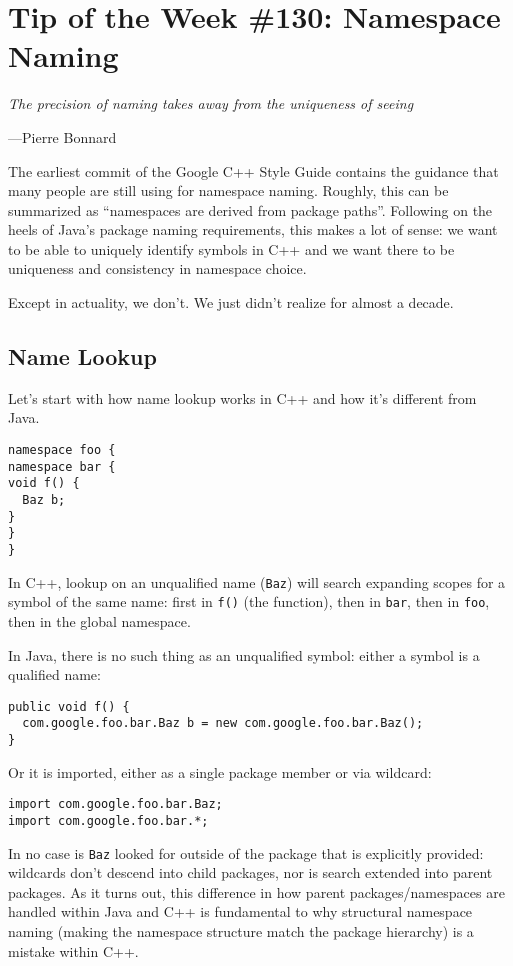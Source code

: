 
\chapter{Tip of the Week \#130: Namespace Naming}\label{ch:tip-of-the-week-130}

\epigraph{\itshape The precision of naming takes away from the uniqueness of seeing}{---Pierre Bonnard}

The earliest commit of the Google C++ Style Guide contains the guidance that many people are still using for namespace naming. Roughly, this can be summarized as \enquote{namespaces are derived from package paths}. Following on the heels of Java’s package naming requirements, this makes a lot of sense: we want to be able to uniquely identify symbols in C++ and we want there to be uniqueness and consistency in namespace choice.

Except in actuality, we don’t. We just didn’t realize for almost a decade.

\section{Name Lookup}
Let’s start with how name lookup works in C++ and how it’s different from Java.
\begin{verbatim}
namespace foo {
namespace bar {
void f() {
  Baz b;
}
}
}
\end{verbatim}

In C++, lookup on an unqualified name (\texttt{Baz}) will search expanding scopes for a symbol of the same name: first in \texttt{f()} (the function), then in \texttt{bar}, then in \texttt{foo}, then in the global namespace.

In Java, there is no such thing as an unqualified symbol: either a symbol is a qualified name:
\begin{verbatim}
public void f() {
  com.google.foo.bar.Baz b = new com.google.foo.bar.Baz();
}
\end{verbatim}

Or it is imported, either as a single package member or via wildcard:
\begin{verbatim}
import com.google.foo.bar.Baz;
import com.google.foo.bar.*;
\end{verbatim}

In no case is \texttt{Baz} looked for outside of the package that is explicitly provided: wildcards don’t descend into child packages, nor is search extended into parent packages. As it turns out, this difference in how parent packages/namespaces are handled within Java and C++ is fundamental to why structural namespace naming (making the namespace structure match the package hierarchy) is a mistake within C++.

